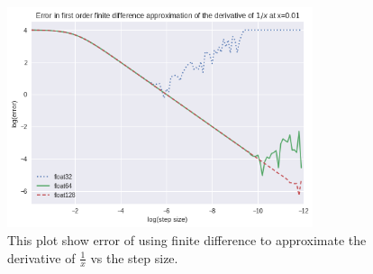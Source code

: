 \begin{figure}[hbt!]
    \centering
    \includegraphics[width=0.8\textwidth]{images/1_x_error_at_p01.png}
    \caption{This plot show error of using finite difference to approximate the derivative of $\frac{1}{x}$ vs the step size.}\label{fig:1/x_0.01}
\end{figure}